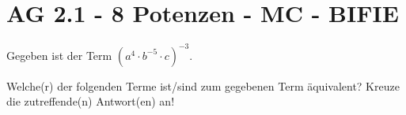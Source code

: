 \section{AG 2.1 - 8 Potenzen - MC - BIFIE}

\begin{beispiel}[AG 2.1]{1} %
		Gegeben ist der Term $(a^4 \cdot b^{-5} \cdot c)^{-3}$.
				
				\leer
				
Welche(r) der folgenden Terme ist/sind zum gegebenen Term äquivalent?
Kreuze die zutreffende(n) Antwort(en) an! 				
				
				
\end{beispiel}
